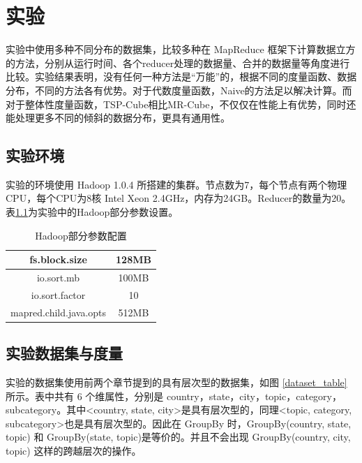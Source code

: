 \chapter{实验}

实验中使用多种不同分布的数据集，比较多种在 MapReduce 框架下计算数据立方的方法，分别从运行时间、各个reducer处理的数据量、合并的数据量等角度进行比较。实验结果表明，没有任何一种方法是``万能”的，根据不同的度量函数、数据分布，不同的方法各有优势。对于代数度量函数，Naive的方法足以解决计算。而对于整体性度量函数，TSP-Cube相比MR-Cube，不仅仅在性能上有优势，同时还能处理更多不同的倾斜的数据分布，更具有通用性。

\section{实验环境}
实验的环境使用 Hadoop 1.0.4 所搭建的集群。节点数为7，每个节点有两个物理CPU，每个CPU为8核 Intel Xeon 2.4GHz，内存为24GB。Reducer的数量为20。表\ref{hadoop_parameter}为实验中的Hadoop部分参数设置。

\begin{table}[!ht]
\begin{center}
\begin{tabular}{|c|c|}
\hline 
fs.block.size & 128MB \\ 
\hline 
io.sort.mb & 100MB \\ 
\hline 
io.sort.factor & 10 \\ 
\hline 
mapred.child.java.opts & 512MB \\ 
\hline 
\end{tabular} 
\end{center}
\caption{Hadoop部分参数配置}\label{hadoop_parameter}
\end{table}


\section{实验数据集与度量}

实验的数据集使用前两个章节提到的具有层次型的数据集，如图 \ref{dataset_table} 所示。表中共有 6 个维属性，分别是 country，state，city，topic，category，subcategory。其中\textless country, state, city\textgreater 是具有层次型的，同理\textless topic, category, subcategory\textgreater 也是具有层次型的。因此在 GroupBy 时，GroupBy(country, state, topic) 和 GroupBy(state, topic)是等价的。并且不会出现 GroupBy(country, city, topic) 这样的跨越层次的操作。


